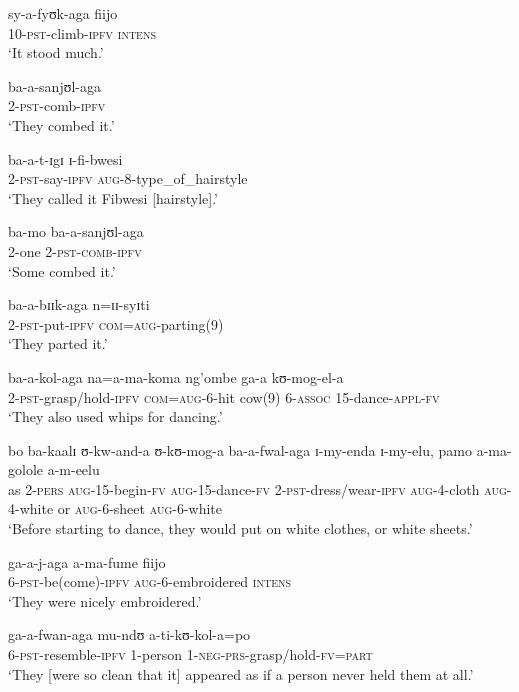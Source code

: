 \begin{exe}
\ex \gll sy-a-fyʊk-aga fiijo\\
10-\textsc{pst}-climb-\textsc{ipfv} \textsc{intens}\\
\glt \lq It stood much.'

\ex \gll ba-a-sanjʊl-aga\\
2-\textsc{pst}-comb-\textsc{ipfv}\\
\glt \lq They combed it.'

\ex \gll ba-a-t-ɪgɪ ɪ-fi-bwesi\\
2-\textsc{pst}-say-\textsc{ipfv} \textsc{aug}-8-type\_of\_hairstyle\\
\glt \lq They called it Fibwesi [hairstyle].'

\ex \gll ba-mo ba-a-sanjʊl-aga\\
2-one 2-\textsc{pst}-\textsc{comb}-\textsc{ipfv}\\
\glt \lq Some combed it.'

\ex \gll ba-a-bɪɪk-aga n=ɪɪ-syɪti\\
2-\textsc{pst}-put-\textsc{ipfv} \textsc{com}=\textsc{aug}-parting(9)\\
\glt \lq They parted it.'


\ex \gll ba-a-kol-aga na=a-ma-koma ng'ombe ga-a kʊ-mog-el-a\\
2-\textsc{pst}-grasp/hold-\textsc{ipfv} \textsc{com}=\textsc{aug}-6-hit cow(9) 6-\textsc{assoc} 15-dance-\textsc{appl}-\textsc{fv}\\
\glt \lq They also used whips for dancing.'

\ex \gll bo ba-kaalɪ ʊ-kw-and-a ʊ-kʊ-mog-a ba-a-fwal-aga ɪ-my-enda ɪ-my-elu, pamo a-ma-golole a-m-eelu\\
as 2-\textsc{pers} \textsc{aug}-15-begin-\textsc{fv} \textsc{aug}-15-dance-\textsc{fv} 2-\textsc{pst}-dress/wear-\textsc{ipfv} \textsc{aug}-4-cloth \textsc{aug}-4-white or \textsc{aug}-6-sheet \textsc{aug}-6-white\\
\glt \lq Before starting to dance, they would put on white clothes, or white sheets.'

\ex \gll ga-a-j-aga a-ma-fume fiijo\\
6-\textsc{pst}-be(come)-\textsc{ipfv} \textsc{aug}-6-embroidered \textsc{intens}\\
\glt \lq They were nicely embroidered.'

\ex \gll ga-a-fwan-aga mu-ndʊ a-ti-kʊ-kol-a=po\\
6-\textsc{pst}-resemble-\textsc{ipfv} 1-person 1-\textsc{neg}-\textsc{prs}-grasp/hold-\textsc{fv}=\textsc{part}\\
\glt \lq They [were so clean that it] appeared as if a person never held them at all.'


\end{exe}
